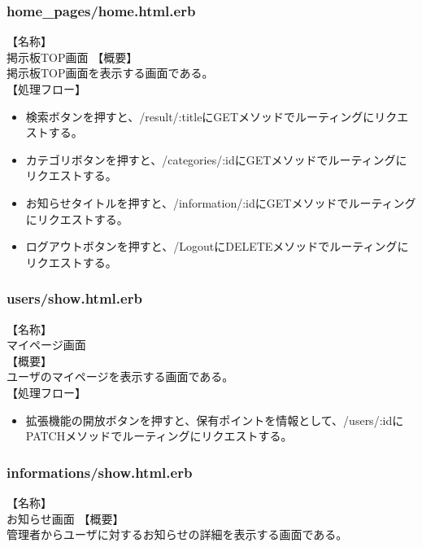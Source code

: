 \documentclass[a4j]{jarticle}
\begin{document}
\subsubsection{home\_pages/home.html.erb}
\noindent
【名称】\\
掲示板TOP画面
【概要】\\
掲示板TOP画面を表示する画面である。\\
【処理フロー】
\begin{itemize}
  \item 検索ボタンを押すと、/result/:titleにGETメソッドでルーティングにリクエストする。
  \item カテゴリボタンを押すと、/categories/:idにGETメソッドでルーティングにリクエストする。
  \item お知らせタイトルを押すと、/information/:idにGETメソッドでルーティングにリクエストする。
  \item ログアウトボタンを押すと、/LogoutにDELETEメソッドでルーティングにリクエストする。
\end{itemize}

\subsubsection{users/show.html.erb}
\noindent
【名称】\\
マイページ画面\\
【概要】\\
ユーザのマイページを表示する画面である。\\
【処理フロー】
\begin{itemize}
  \item 拡張機能の開放ボタンを押すと、保有ポイントを情報として、/users/:idにPATCHメソッドでルーティングにリクエストする。
\end{itemize}

\subsubsection{informations/show.html.erb}
\noindent
【名称】\\
お知らせ画面
【概要】\\
管理者からユーザに対するお知らせの詳細を表示する画面である。\\
\end{document}
